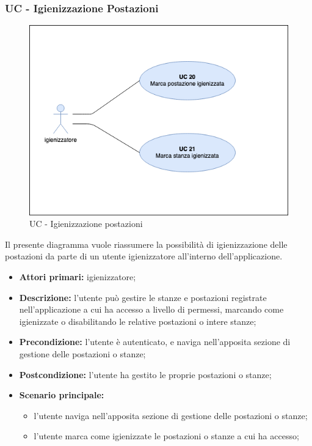 \subsubsection{UC - Igienizzazione Postazioni}

\begin{figure}[h]
  \centering
    \includegraphics[scale=0.5]{src/CasiDUso/Immagini/UC-igienizzazionePostazioni.png}
  \caption{UC  - Igienizzazione postazioni}
\end{figure}

Il presente diagramma vuole riassumere la possibilità di igienizzazione delle postazioni da parte di un utente igienizzatore all'interno dell’applicazione.

\begin{itemize}
\item \textbf{Attori primari:} igienizzatore;
\item \textbf{Descrizione:} l’utente può gestire le stanze e postazioni registrate nell’applicazione a cui ha accesso a livello di permessi, marcando come igienizzate o disabilitando le relative postazioni o intere stanze;
\item \textbf{Precondizione:} l'utente è autenticato, e naviga nell’apposita sezione di gestione delle postazioni o stanze;
\item \textbf{Postcondizione:} l’utente ha gestito le proprie postazioni o stanze;
\item \textbf{Scenario principale:} 
	\begin{itemize}
		\item l’utente naviga nell’apposita sezione di gestione delle postazioni o stanze;
		\item l’utente marca come igienizzate le postazioni o stanze a cui ha accesso;
	\end{itemize}
\end{itemize}

